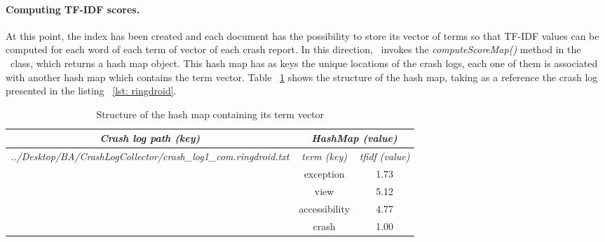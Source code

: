 \paragraph{Computing TF-IDF scores.} At this point, the index has been created and each document has the possibility to store its vector of terms so that TF-IDF values can be computed for each word of each term of vector of each crash report. 
In this direction, \toolname\ invokes the \textit{computeScoreMap()} method in the \TFIDF\ class, which returns a hash map object. 
This hash map has as keys the unique locations of the crash logs, each one of them is associated with another hash map which contains the term vector.
Table ~\ref{tbl: scoremap} shows the structure of the hash map, taking as a reference the crash log presented in the listing ~\ref{lst: ringdroid}. 
\begin{table}[htb]
\centering
\caption{Structure of the hash map containing its term vector}
\label{tbl: scoremap}
\begin{tabular}{l|c|c|}
\hline
\multicolumn{1}{|c|}{{\color[HTML]{000000} \textit{\textbf{Crash log path (key)}}}}                                 & \multicolumn{2}{c|}{{\color[HTML]{000000} \textit{\textbf{HashMap (value)}}}} \\ \hline
\multicolumn{1}{|l|}{\textit{../Desktop/BA/CrashLogCollector/crash\_log1\_com.ringdroid.txt}} & {\textit{term (key)}}                   & { \textit{tfidf (value)}}                  \\ \hline
                                                                                                            & \hspace{0.7cm}exception\hspace{0.7cm}                             & \hspace{0.2cm}1.73\hspace{0.2cm}                                      \\ \cline{2-3} 
                                                                                                            & view                               & 5.12                                  \\ \cline{2-3} 
                                                                                                            & accessibility                         & 4.77                                  \\ \cline{2-3} 
                                                                                                            & crash                                 & 1.00                                  \\ \cline{2-3} 

\end{tabular}
\end{table}
